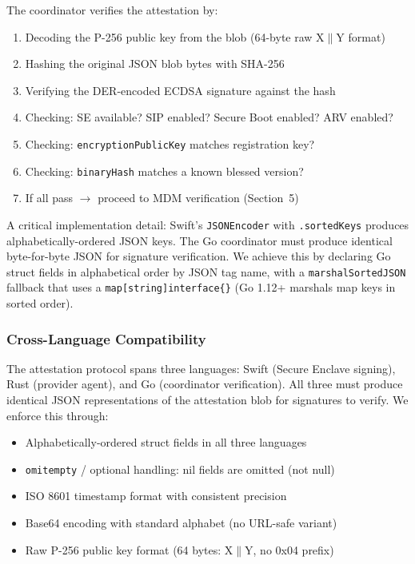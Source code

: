 \documentclass[10pt,twocolumn,letterpaper]{article}
\begin{document}
The coordinator verifies the attestation by:
\begin{enumerate}[leftmargin=*,itemsep=1pt]
    \item Decoding the P-256 public key from the blob (64-byte raw X$\|$Y format)
    \item Hashing the original JSON blob bytes with SHA-256
    \item Verifying the DER-encoded ECDSA signature against the hash
    \item Checking: SE available? SIP enabled? Secure Boot enabled? ARV enabled?
    \item Checking: \texttt{encryptionPublicKey} matches registration key?
    \item Checking: \texttt{binaryHash} matches a known blessed version?
    \item If all pass $\to$ proceed to MDM verification (Section~5)
\end{enumerate}

A critical implementation detail: Swift's \texttt{JSONEncoder} with \texttt{.sortedKeys} produces alphabetically-ordered JSON keys. The Go coordinator must produce identical byte-for-byte JSON for signature verification. We achieve this by declaring Go struct fields in alphabetical order by JSON tag name, with a \texttt{marshalSortedJSON} fallback that uses a \texttt{map[string]interface\{\}} (Go 1.12+ marshals map keys in sorted order).

\subsubsection{Cross-Language Compatibility}

The attestation protocol spans three languages: Swift (Secure Enclave signing), Rust (provider agent), and Go (coordinator verification). All three must produce identical JSON representations of the attestation blob for signatures to verify. We enforce this through:
\begin{itemize}[leftmargin=*,itemsep=1pt]
    \item Alphabetically-ordered struct fields in all three languages
    \item \texttt{omitempty} / optional handling: nil fields are omitted (not null)
    \item ISO 8601 timestamp format with consistent precision
    \item Base64 encoding with standard alphabet (no URL-safe variant)
    \item Raw P-256 public key format (64 bytes: X$\|$Y, no 0x04 prefix)
\end{itemize}
\end{document}
